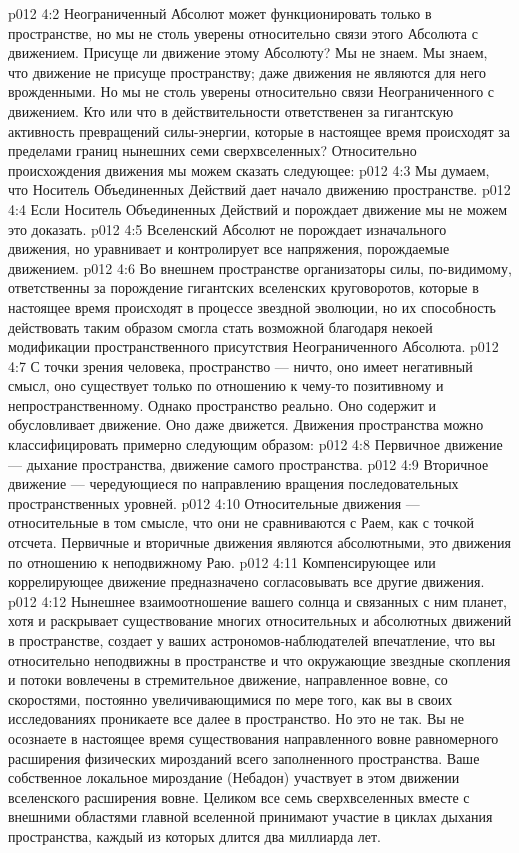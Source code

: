 \vs p012 4:2 Неограниченный Абсолют может функционировать только в пространстве, но мы не столь уверены относительно связи этого Абсолюта с движением. Присуще ли движение этому Абсолюту? Мы не знаем. Мы знаем, что движение не присуще пространству; даже движения  не являются для него врожденными. Но мы не столь уверены относительно связи Неограниченного с движением. Кто или что в действительности ответственен за гигантскую активность превращений силы\hyp{}энергии, которые в настоящее время происходят за пределами границ нынешних семи сверхвселенных? Относительно происхождения движения мы можем сказать следующее:
\vs p012 4:3 \bibnobreakspace Мы думаем, что Носитель Объединенных Действий дает начало движению  пространстве.
\vs p012 4:4 \bibnobreakspace Если Носитель Объединенных Действий и порождает движение  мы не можем это доказать.
\vs p012 4:5 \bibnobreakspace Вселенский Абсолют не порождает изначального движения, но уравнивает и контролирует все напряжения, порождаемые движением.
\vs p012 4:6 \pc Во внешнем пространстве организаторы силы, по\hyp{}видимому, ответственны за порождение гигантских вселенских круговоротов, которые в настоящее время происходят в процессе звездной эволюции, но их способность действовать таким образом смогла стать возможной благодаря некоей модификации пространственного присутствия Неограниченного Абсолюта.
\vs p012 4:7 \pc С точки зрения человека, пространство --- ничто, оно имеет негативный смысл, оно существует только по отношению к чему\hyp{}то позитивному и непространственному. Однако пространство реально. Оно содержит и обусловливает движение. Оно даже движется. Движения пространства можно классифицировать примерно следующим образом:
\vs p012 4:8 \bibnobreakspace Первичное движение --- дыхание пространства, движение самого пространства.
\vs p012 4:9 \bibnobreakspace Вторичное движение --- чередующиеся по направлению вращения последовательных пространственных уровней.
\vs p012 4:10 \bibnobreakspace Относительные движения --- относительные в том смысле, что они не сравниваются с Раем, как с точкой отсчета. Первичные и вторичные движения являются абсолютными, это движения по отношению к неподвижному Раю.
\vs p012 4:11 \bibnobreakspace Компенсирующее или коррелирующее движение предназначено согласовывать все другие движения.
\vs p012 4:12 \pc Нынешнее взаимоотношение вашего солнца и связанных с ним планет, хотя и раскрывает существование многих относительных и абсолютных движений в пространстве, создает у ваших астрономов\hyp{}наблюдателей впечатление, что вы относительно неподвижны в пространстве и что окружающие звездные скопления и потоки вовлечены в стремительное движение, направленное вовне, со скоростями, постоянно увеличивающимися по мере того, как вы в своих исследованиях проникаете все далее в пространство. Но это не так. Вы не осознаете в настоящее время существования направленного вовне равномерного расширения физических мирозданий всего заполненного пространства. Ваше собственное локальное мироздание (Небадон) участвует в этом движении вселенского расширения вовне. Целиком все семь сверхвселенных вместе с внешними областями главной вселенной принимают участие в циклах дыхания пространства, каждый из которых длится два миллиарда лет.
